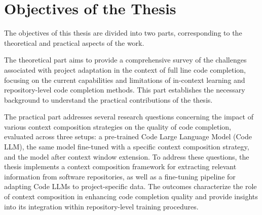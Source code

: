 \chapter*{Objectives of the Thesis}

The objectives of this thesis are divided into two parts, corresponding to the theoretical and practical aspects of the work.

The theoretical part aims to provide a comprehensive survey of the challenges associated with project adaptation in the context of full line code completion, focusing on the current capabilities and limitations of in-context learning and repository-level code completion methods. This part establishes the necessary background to understand the practical contributions of the thesis.

The practical part addresses several research questions concerning the impact of various context composition strategies on the quality of code completion, evaluated across three setups: a pre-trained Code Large Language Model (Code LLM), the same model fine-tuned with a specific context composition strategy, and the model after context window extension. To address these questions, the thesis implements a context composition framework for extracting relevant information from software repositories, as well as a fine-tuning pipeline for adapting Code LLMs to project-specific data. The outcomes characterize the role of context composition in enhancing code completion quality and provide insights into its integration within repository-level training procedures.
